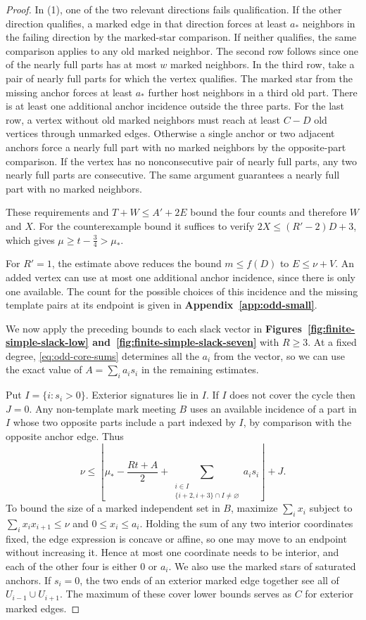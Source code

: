 \begin{proof}
In (1), one of the two relevant directions fails qualification.
If the other direction qualifies, a marked edge
in that direction forces at least $a_*$ neighbors in the failing
direction by the marked-star comparison. If neither qualifies, the
same comparison applies to any old marked neighbor. The second row
follows since one of the nearly full parts has at most $w$ marked
neighbors. In the third row, take a pair of nearly full parts for
which the vertex qualifies. The marked star from the missing anchor forces
at least $a_*$ further host neighbors in a third old part. There is
at least one additional anchor incidence outside the three parts.
For the last row, a vertex without old marked neighbors must reach
at least $C-D$ old vertices through unmarked edges. Otherwise a
single anchor or two adjacent anchors force a nearly full part
with no marked neighbors by the opposite-part comparison.
If the vertex has no nonconsecutive pair of nearly full parts, any
two nearly full parts are consecutive. The same argument guarantees
a nearly full part with no marked neighbors.

These requirements and $T+W\leq A'+2E$ bound the four counts and
therefore $W$ and $X$. For the counterexample bound it suffices to
verify $2X\leq (R'-2)D+3$, which gives $\mu\geq t-\frac{3}{4}>\mu_*$.

For $R'=1$, the estimate above reduces the bound $m\leq f(D)$ to 
$E\leq\nu+V$. An added vertex can use at most one additional anchor
incidence, since there is only one available. The count for the possible
choices of this incidence and the missing template pairs at its endpoint
is given in \textbf{Appendix~\ref{app:odd-small}}.

We now apply the preceding bounds to each slack vector in
\textbf{Figures~\ref{fig:finite-simple-slack-low}
and~\ref{fig:finite-simple-slack-seven}} with $R\geq3$.
At a fixed degree, \eqref{eq:odd-core-sums} determines all the
$a_i$ from the vector, so we can use the exact value of
$A=\sum_i a_is_i$ in the remaining estimates.

Put $I=\{i:s_i>0\}$. Exterior signatures lie in $I$. If $I$ does
not cover the cycle then $J=0$. Any non-template mark meeting $B$
uses an available incidence of a part in $I$ whose two opposite
parts include a part indexed by $I$,
by comparison with the opposite anchor edge. Thus
\[
 \nu\leq\left\lfloor \mu_*-\frac{Rt+A}{2}+
 \sum_{\substack{i\in I\\ \{i+2,i+3\}\cap I\ne\varnothing}}a_is_i
 \right\rfloor+J.
\]
To bound the size of a marked independent set in $B$, maximize
$\sum_i x_i$ subject to $\sum_i x_ix_{i+1}\leq \nu$ and
$0\leq x_i\leq a_i$. Holding the sum of any two interior coordinates
fixed, the edge expression is concave or affine, so one may move to
an endpoint without increasing it. Hence at most one coordinate
needs to be interior, and each of the other four is either $0$ or
$a_i$. We also use the marked stars of saturated anchors.
If $s_i=0$, the two ends of an exterior marked edge together
see all of $U_{i-1}\cup U_{i+1}$. The maximum of these cover
lower bounds serves as $C$ for exterior marked edges.


\end{proof}
